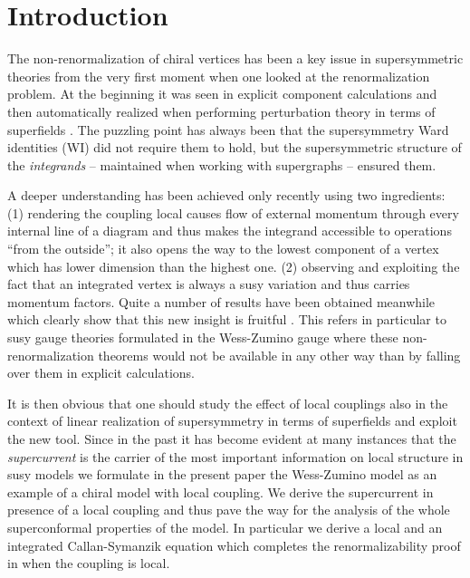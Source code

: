\documentclass[a4paper,12pt]{article}
\begin{document}
\section{Introduction}
\setcounter{equation}{0}

The non-renormalization of chiral vertices has been a key issue
in supersymmetric theories from the very first moment when
one looked at the renormalization problem.
At the beginning it was seen in explicit component calculations
 \cite{WZ}
and then automatically realized when
performing perturbation theory in terms of superfields \cite{FuLa, FePi,GSR79}.
The puzzling point has always been that the supersymmetry Ward identities
(WI) did not require them to hold, but the supersymmetric structure
of the {\sl integrands} -- maintained when working with supergraphs --
ensured them. 

A deeper understanding has been achieved only recently
\cite{FK} using two ingredients: (1) rendering the coupling local
causes flow of external momentum through every internal line of
a diagram and thus makes the integrand accessible to operations
``from the outside''; it also opens the way to the lowest \myHighlight{$\theta$}\coordHE{} component
of a vertex which has lower dimension than the highest one. (2)
observing and exploiting the fact that an integrated vertex is always
a susy variation and thus carries momentum factors.
Quite a number of results have been obtained meanwhile which
clearly show that this new insight is fruitful
\cite{KRST01,KR01,KR01anom}. This refers in
particular to susy gauge theories formulated in the Wess-Zumino
gauge  where these non-renormalization theorems would not be
available in any other way than by falling over them in
explicit calculations. 

It is then obvious that one should
study the effect of local couplings also in the context
of linear realization of supersymmetry in terms of superfields 
and exploit the new tool. Since in the past it has become
evident at many instances that the {\sl supercurrent} is the
carrier of the most important information on local structure
in susy models we formulate in the present paper the
Wess-Zumino model as an example of a chiral model with
local coupling. We derive the supercurrent in presence of
a local coupling and thus pave the way for the analysis
of the whole superconformal properties of the model. 
In particular we derive a local and an integrated
Callan-Symanzik equation which completes the renormalizability proof
in \cite{FK} when the coupling is local.
\end{document}
